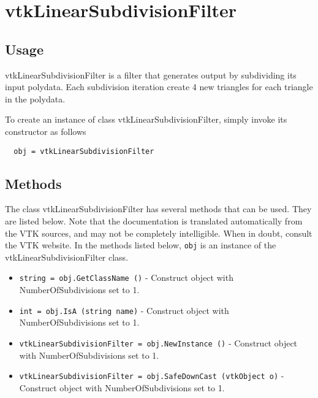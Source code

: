 \section{vtkLinearSubdivisionFilter}

\subsection{Usage}

 vtkLinearSubdivisionFilter is a filter that generates output by
 subdividing its input polydata. Each subdivision iteration create 4
 new triangles for each triangle in the polydata.

To create an instance of class vtkLinearSubdivisionFilter, simply
invoke its constructor as follows
\begin{verbatim}
  obj = vtkLinearSubdivisionFilter
\end{verbatim}
\subsection{Methods}

The class vtkLinearSubdivisionFilter has several methods that can be used.
  They are listed below.
Note that the documentation is translated automatically from the VTK sources,
and may not be completely intelligible.  When in doubt, consult the VTK website.
In the methods listed below, \verb|obj| is an instance of the vtkLinearSubdivisionFilter class.
\begin{itemize}
\item  \verb|string = obj.GetClassName ()| -  Construct object with NumberOfSubdivisions set to 1.

\item  \verb|int = obj.IsA (string name)| -  Construct object with NumberOfSubdivisions set to 1.

\item  \verb|vtkLinearSubdivisionFilter = obj.NewInstance ()| -  Construct object with NumberOfSubdivisions set to 1.

\item  \verb|vtkLinearSubdivisionFilter = obj.SafeDownCast (vtkObject o)| -  Construct object with NumberOfSubdivisions set to 1.

\end{itemize}
